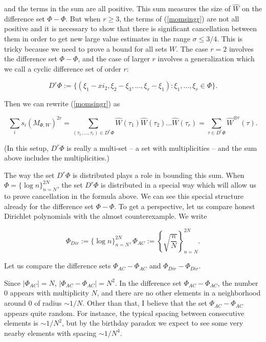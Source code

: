 \documentclass{amsart}
\begin{document}
\noindent and the terms in the sum are all positive.   This sum measures the size of $\hat W$ on the difference set $\Phi - \Phi$.  But when $r \ge 3$,  the terms of (\ref{momsingr}) are not all positive and it is necessary to show that there is significant cancellation between them in order to get new large value estimates in the range $\sigma \le 3/4$.    This is tricky because we need to prove a bound for all sets $W$.   The case $r=2$ involves the difference set $\Phi - \Phi$,  and the case of larger $r$ involves a generalization which we call a cyclic difference set of order $r$:

\begin{equation} \label{defcycdiff} D^r \Phi := \{ ( \xi_1 - xi_2,  \xi_2 - \xi_3, ..., \xi_r - \xi_1): \xi_1, ..., \xi_r \in \Phi \}. 
\end{equation}

Then we can rewrite (\ref{momsingr}) as

\begin{equation} \label{momsingr2}
\sum_i s_i( M_{\Phi, W})^{2r} = \sum_{(\tau_1, ..., \tau_r) \in D^r \Phi} \hat W(\tau_1) \hat W(\tau_2) ... \hat W(\tau_r) = \sum_{\tau \in D^r \Phi} \hat W^{\otimes r} (\tau).
\end{equation}

(In this setup,  $D^r \Phi$ is really a multi-set -- a set with multiplicities -- and the sum above includes the multiplicities.)

The way the set $D^r \Phi$ is distributed plays a role in bounding this sum.   When $\Phi = \{ \log n \}_{n=N}^{2N}$,  the set $D^r \Phi$ is distributed in a special way which will allow us to prove cancellation in the formula above.   We can see this special structure already for the difference set $\Phi - \Phi$.   To get a perspective,  let us compare honest Dirichlet polynomials with the almost counterexample.  We write

$$ \Phi_{Dir} := \{ \log n \}_{n = N}^{2N}, \Phi_{AC} := \left\{ \sqrt{\frac{n}{N}} \right\}_{n=N}^{2N}. $$

\noindent Let us compare the difference sets $\Phi_{AC} - \Phi_{AC}$ and $\Phi_{Dir} - \Phi_{Dir}$.  

Since $| \Phi_{AC} | = N$,  $| \Phi_{AC} - \Phi_{AC} | = N^2$.   In the difference set $\Phi_{AC} - \Phi_{AC}$,  the number 0 appears with multiplicity $N$,  and there are no other elements in a neighborhood around 0 of radius $\sim 1/N$.   Other than that,  I believe that the set $\Phi_{AC} - \Phi_{AC}$ appears quite random.   For instance,  the typical spacing between consecutive elements is $\sim 1/ N^2$,  but by the birthday paradox we expect to see some very nearby elements with spacing $\sim 1/N^4$.   
\end{document}
